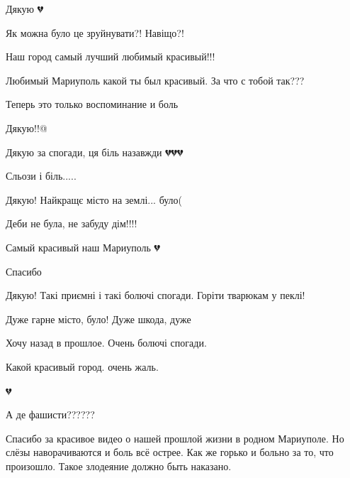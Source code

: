 
Дякую 💔


Як можна було це зруйнувати?! Навіщо?!


Наш город самый лучший любимый красивый!!!


Любимый Мариуполь какой ты был красивый. За что с тобой так???


Теперь это только воспоминание и боль


Дякую!!@


Дякую за спогади, ця біль назавжди 💔💔💔


Сльози і біль.....


Дякую! Найкращє місто на землі... було(


Деби не була, не забуду дім!!!!


Самый красивый наш Мариуполь 💔


Спасибо


Дякую! Такі приємні і такі болючі спогади. Горіти тварюкам у пеклі!


Дуже гарне місто, було! Дуже шкода, дуже


Хочу назад в прошлое. Очень болючі спогади.


Какой красивый город. очень жаль.

💔


А де фашисти??????


Спасибо за красивое видео о нашей прошлой жизни в родном Мариуполе. Но слёзы
наворачиваются и боль всё острее. Как же горько и больно за то, что
произошло. Такое злодеяние должно быть наказано.

